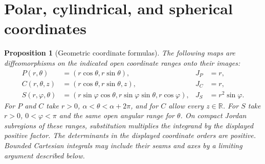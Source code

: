 \documentclass[11pt,oneside,openany]{book}
\newtheorem{proposition}[theorem]{Proposition}
\theoremstyle{definition}
\theoremstyle{remark}
\newcommand{\R}{\mathbb R}
\newcommand{\family}[1]{}
\begin{document}
\section{Polar, cylindrical, and spherical coordinates}
\family{K04.07.06}\family{K04.07.07}
\begin{proposition}[Geometric coordinate formulas]\label{d04:07:coordinates}
The following maps are diffeomorphisms on the indicated open coordinate ranges onto their images:
\begin{align*}
 P(r,\theta)&=(r\cos\theta,r\sin\theta),& J_P&=r,\\
 C(r,\theta,z)&=(r\cos\theta,r\sin\theta,z),&J_C&=r,\\
 S(r,\varphi,\theta)&=(r\sin\varphi\cos\theta,r\sin\varphi\sin\theta,r\cos\varphi),&J_S&=r^2\sin\varphi.
\end{align*}
For $P$ and $C$ take $r>0$, $\alpha<\theta<\alpha+2\pi$, and for $C$
allow every $z\in\R$. For $S$ take $r>0$, $0<\varphi<\pi$ and the same
open angular range for $\theta$.
On compact Jordan subregions of these ranges, substitution multiplies the integrand by the displayed positive factor. The determinants in the displayed coordinate orders are positive. Bounded Cartesian integrals may include their seams and axes by a limiting argument described below.
\end{proposition}
\end{document}
